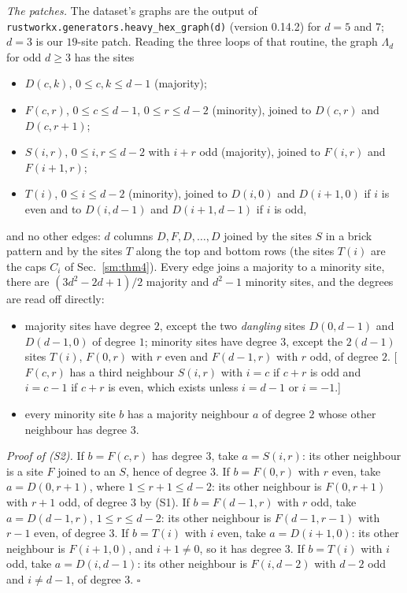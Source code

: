 \documentclass[aps,prx,onecolumn,10pt,nofootinbib,longbibliography,floatfix]{revtex4-2}
\theoremstyle{remark}
\begin{document}
\emph{The patches.} The dataset's graphs are the output of \texttt{rustworkx.generators.heavy\_hex\_graph(d)}
(version 0.14.2) for $d=5$ and $7$; $d=3$ is our $19$-site patch. Reading the three loops of that routine, the %
graph $\Lambda_d$ for odd $d\ge3$ has the sites
\begin{itemize}
\item $D(c,k)$, $0\le c,k\le d-1$ (majority);
\item $F(c,r)$, $0\le c\le d-1$, $0\le r\le d-2$ (minority), joined to $D(c,r)$ and $D(c,r+1)$;
\item $S(i,r)$, $0\le i,r\le d-2$ with $i+r$ odd (majority), joined to $F(i,r)$ and $F(i+1,r)$;
\item $T(i)$, $0\le i\le d-2$ (minority), joined to $D(i,0)$ and $D(i+1,0)$ if $i$ is even and to $D(i,d-1)$ and
$D(i+1,d-1)$ if $i$ is odd,
\end{itemize}
and no other edges: $d$ columns $D,F,D,\dots,D$ joined by the sites $S$ in a brick pattern and by the sites $T$
along the top and bottom rows (the sites $T(i)$ are the caps $C_i$ of Sec.~\ref{sm:thm4}). Every edge joins a
majority to a minority site, there are $(3d^2-2d+1)/2$ majority
and $d^2-1$ minority sites, and the degrees are read off directly:
\begin{itemize}
\item[(S1)] majority sites have degree $2$, except the two \emph{dangling} sites $D(0,d-1)$ and $D(d-1,0)$ of %
degree $1$; minority sites have degree $3$, except the $2(d-1)$ sites $T(i)$, $F(0,r)$ with $r$ even and %
$F(d-1,r)$ with $r$ odd, of degree $2$. [$F(c,r)$ has a third neighbour $S(i,r)$ with $i=c$ if $c+r$ is odd and %
$i=c-1$ if $c+r$ is even, which exists unless $i=d-1$ or $i=-1$.]
\item[(S2)] every minority site $b$ has a majority neighbour $a$ of degree $2$ whose other neighbour has %
degree $3$. %
\end{itemize}
\emph{Proof of (S2).} If $b=F(c,r)$ has degree $3$, take $a=S(i,r)$: its other neighbour is a site $F$ joined to %
an $S$, hence of degree $3$. If $b=F(0,r)$ with $r$ even, take $a=D(0,r+1)$, where $1\le r+1\le d-2$: its other %
neighbour is $F(0,r+1)$ with $r+1$ odd, of degree $3$ by (S1). If $b=F(d-1,r)$ with $r$ odd, take $a=D(d-1,r)$, %
$1\le r\le d-2$: its other neighbour is $F(d-1,r-1)$ with $r-1$ even, of degree $3$. If $b=T(i)$ with $i$ even, %
take $a=D(i+1,0)$: its other neighbour is $F(i+1,0)$, and $i+1\ne0$, so it has degree $3$. If $b=T(i)$ with $i$ %
odd, take $a=D(i,d-1)$: its other neighbour is $F(i,d-2)$ with $d-2$ odd and $i\ne d-1$, of degree $3$. %
\hfill$\square$
\end{document}
